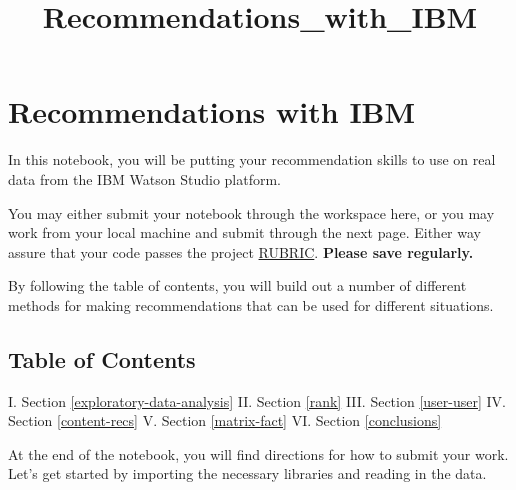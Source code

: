 \documentclass[11pt]{article}
\title{Recommendations\_with\_IBM}
\begin{document}
    
    
    \maketitle
    
    

    
    \section{Recommendations with IBM}\label{recommendations-with-ibm}

In this notebook, you will be putting your recommendation skills to use
on real data from the IBM Watson Studio platform.

You may either submit your notebook through the workspace here, or you
may work from your local machine and submit through the next page.
Either way assure that your code passes the project
\href{https://review.udacity.com/\#!/rubrics/2322/view}{RUBRIC}.
\textbf{Please save regularly.}

By following the table of contents, you will build out a number of
different methods for making recommendations that can be used for
different situations.

\subsection{Table of Contents}\label{table-of-contents}

I. Section \ref{exploratory-data-analysis} II. Section \ref{rank} III.
Section \ref{user-user} IV. Section \ref{content-recs} V.
Section \ref{matrix-fact} VI. Section \ref{conclusions}

At the end of the notebook, you will find directions for how to submit
your work. Let's get started by importing the necessary libraries and
reading in the data.
\end{document}
